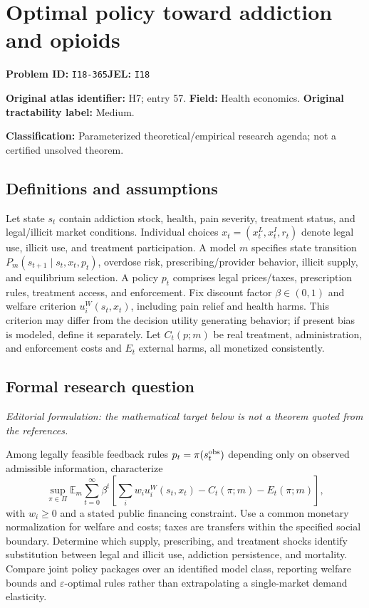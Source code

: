 \documentclass[11pt,a4paper]{article}
\begin{document}
\section*{Optimal policy toward addiction and opioids}
\textbf{Problem ID:} \texttt{I18-365}\quad \textbf{JEL:} \texttt{I18}\par
\label{problem:OP-0057}
\label{atlas:prob:H7}
\noindent\textbf{Original atlas identifier:} H7; entry 57. \textbf{Field:} Health economics. \textbf{Original tractability label:} Medium.

\noindent\textbf{Classification:} Parameterized theoretical/empirical research agenda; not a certified unsolved theorem.

\subsection*{Definitions and assumptions}
Let state $s_t$ contain addiction stock, health, pain severity, treatment status, and legal/illicit market conditions. Individual choices $x_t=(x_t^{L},x_t^{I},r_t)$ denote legal use, illicit use, and treatment participation. A model $m$ specifies state transition $P_m(s_{t+1}\mid s_t,x_t,p_t)$, overdose risk, prescribing/provider behavior, illicit supply, and equilibrium selection. A policy $p_t$ comprises legal prices/taxes, prescription rules, treatment access, and enforcement. Fix discount factor $\beta\in(0,1)$ and welfare criterion $u_i^{W}(s_t,x_t)$, including pain relief and health harms. This criterion may differ from the decision utility generating behavior; if present bias is modeled, define it separately. Let $C_t(p;m)$ be real treatment, administration, and enforcement costs and $E_t$ external harms, all monetized consistently.

\subsection*{Formal research question}
\emph{Editorial formulation: the mathematical target below is not a theorem quoted from the references.}

Among legally feasible feedback rules $p_t=\pi(s_t^{\rm obs})$ depending only on observed admissible information, characterize
\[
 \sup_{\pi\in\Pi}\mathbb E_m\sum_{t=0}^{\infty}\beta^t
 \left[\sum_iw_i u_i^{W}(s_t,x_t)-C_t(\pi;m)-E_t(\pi;m)\right],
\]
with $w_i\geq0$ and a stated public financing constraint. Use a common monetary normalization for welfare and costs; taxes are transfers within the specified social boundary. Determine which supply, prescribing, and treatment shocks identify substitution between legal and illicit use, addiction persistence, and mortality. Compare joint policy packages over an identified model class, reporting welfare bounds and $\varepsilon$-optimal rules rather than extrapolating a single-market demand elasticity.
\end{document}
